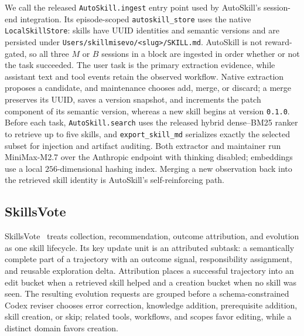\documentclass{article}
\begin{document}
We call the released \texttt{AutoSkill.ingest} entry point used by AutoSkill's
session-end integration. Its episode-scoped \texttt{autoskill\_store} uses the
native \texttt{LocalSkillStore}: skills have UUID identities and semantic versions
and are persisted under
\texttt{Users/skillmisevo/<slug>/SKILL.md}. AutoSkill is not reward-gated, so all
three $M$ or $B$ sessions in a block are ingested in order whether or not the task
succeeded. The user task is the primary extraction evidence, while assistant text
and tool events retain the observed workflow. Native extraction proposes a
candidate, and maintenance chooses add, merge, or discard; a merge preserves its
UUID, saves a version snapshot, and increments the patch component of its semantic
version, whereas a new skill begins at version \texttt{0.1.0}. Before each task,
\texttt{AutoSkill.search} uses the released hybrid dense--BM25 ranker to retrieve
up to five skills, and \texttt{export\_skill\_md} serializes exactly the selected
subset for injection and artifact auditing. Both extractor and maintainer run
MiniMax-M2.7 over the Anthropic endpoint with thinking disabled; embeddings use a
local $256$-dimensional hashing index. Merging a new observation back into the
retrieved skill identity is AutoSkill's self-reinforcing path.

\subsection{SkillsVote}

SkillsVote~\citep{liu2026skillsvote} treats collection, recommendation, outcome
attribution, and evolution as one skill lifecycle. Its key update unit is an
attributed subtask: a semantically complete part of a trajectory with an outcome
signal, responsibility assignment, and reusable exploration delta. Attribution
places a successful trajectory into an edit bucket when a retrieved skill helped
and a creation bucket when no skill was seen. The resulting evolution requests are
grouped before a schema-constrained Codex reviser chooses error correction,
knowledge addition, prerequisite addition, skill creation, or skip; related tools,
workflows, and scopes favor editing, while a distinct domain favors creation.
\end{document}
